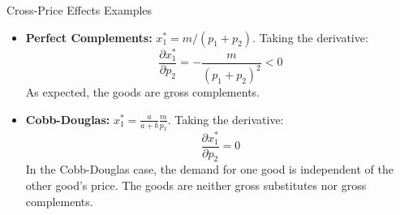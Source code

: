 \begin{examplebox}{Cross-Price Effects Examples}
~
\begin{itemize}
    \item \textbf{Perfect Complements:} $x_1^* = m/(p_1+p_2)$. Taking the derivative:
    \[ \frac{\partial x_1^*}{\partial p_2} = -\frac{m}{(p_1+p_2)^2} < 0 \]
    As expected, the goods are gross complements.
    \item \textbf{Cobb-Douglas:} $x_1^* = \frac{a}{a+b}\frac{m}{p_1}$. Taking the derivative:
    \[ \frac{\partial x_1^*}{\partial p_2} = 0 \]
    In the Cobb-Douglas case, the demand for one good is independent of the other good's price. The goods are neither gross substitutes nor gross complements.
\end{itemize}
\end{examplebox}